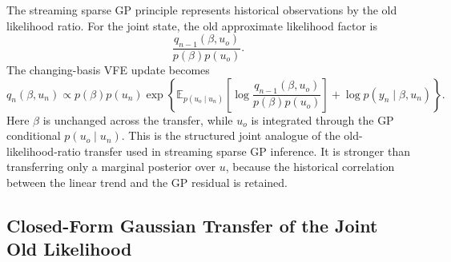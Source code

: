 \documentclass[12pt]{article}
\newcommand{\E}{\mathbb{E}}
\begin{document}
The streaming sparse GP principle represents historical observations by the
old likelihood ratio. For the joint state, the old approximate likelihood
factor is
\begin{equation}
    \frac{q_{n-1}(\beta,u_o)}{p(\beta)p(u_o)} .
\end{equation}
The changing-basis VFE update becomes
\begin{equation}
    q_n(\beta,u_n)
    \propto
    p(\beta)p(u_n)
    \exp
    \left\{
    \E_{p(u_o\mid u_n)}
    \left[
        \log
        \frac{q_{n-1}(\beta,u_o)}{p(\beta)p(u_o)}
    \right]
    +
    \log p(y_n\mid \beta,u_n)
    \right\}.
    \label{eq:joint_streaming_vfe}
\end{equation}
Here $\beta$ is unchanged across the transfer, while $u_o$ is integrated through
the GP conditional $p(u_o\mid u_n)$. This is the structured joint analogue of
the old-likelihood-ratio transfer used in streaming sparse GP inference. It is
stronger than transferring only a marginal posterior over $u$, because the
historical correlation between the linear trend and the GP residual is retained.

\subsection{Closed-Form Gaussian Transfer of the Joint Old Likelihood}
\label{subsec:closed_form_old_likelihood_transfer}
\end{document}
